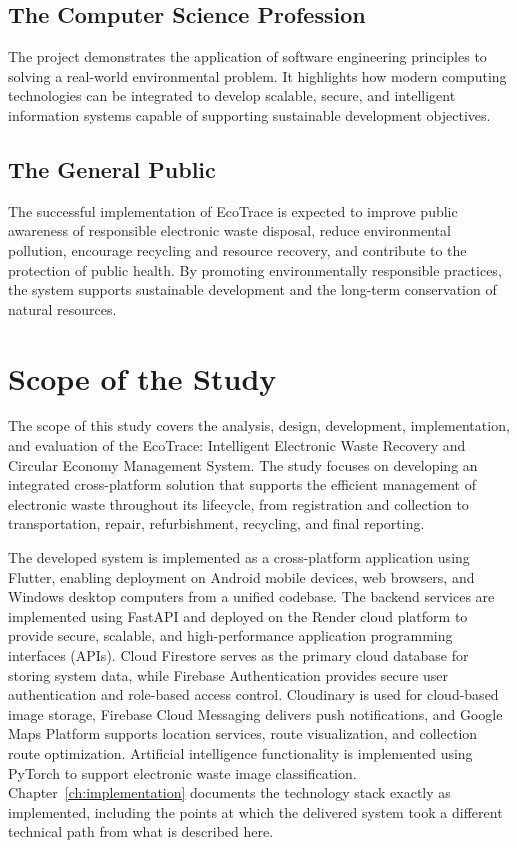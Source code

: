 \subsection{The Computer Science Profession}
The project demonstrates the application of software engineering principles to
solving a real-world environmental problem. It highlights how modern computing
technologies can be integrated to develop scalable, secure, and intelligent
information systems capable of supporting sustainable development objectives.

\subsection{The General Public}
The successful implementation of EcoTrace is expected to improve public awareness
of responsible electronic waste disposal, reduce environmental pollution, encourage
recycling and resource recovery, and contribute to the protection of public health. By
promoting environmentally responsible practices, the system supports sustainable
development and the long-term conservation of natural resources.

\section{Scope of the Study}
\label{sec:scope}

The scope of this study covers the analysis, design, development, implementation,
and evaluation of the EcoTrace: Intelligent Electronic Waste Recovery and
Circular Economy Management System. The study focuses on developing an
integrated cross-platform solution that supports the efficient management of
electronic waste throughout its lifecycle, from registration and collection to
transportation, repair, refurbishment, recycling, and final reporting.

The developed system is implemented as a cross-platform application using
Flutter, enabling deployment on Android mobile devices, web browsers, and Windows
desktop computers from a unified codebase. The backend services are implemented
using FastAPI and deployed on the Render cloud platform to provide secure, scalable,
and high-performance application programming interfaces (APIs). Cloud Firestore
serves as the primary cloud database for storing system data, while Firebase
Authentication provides secure user authentication and role-based access control.
Cloudinary is used for cloud-based image storage, Firebase Cloud Messaging delivers
push notifications, and Google Maps Platform supports location services, route
visualization, and collection route optimization. Artificial intelligence functionality is
implemented using PyTorch to support electronic waste image classification.
Chapter~\ref{ch:implementation} documents the technology stack exactly as
implemented, including the points at which the delivered system took a different
technical path from what is described here.

